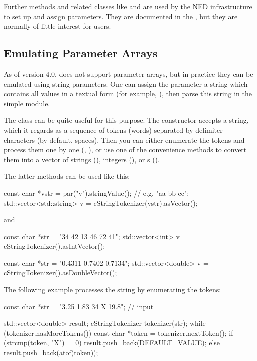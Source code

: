 Further  methods and related classes like  and
 are used by the NED infrastructure to set up and
assign parameters. They are documented in the , but
they are normally of little interest for users.


\subsection{Emulating Parameter Arrays}

As of version 4.0, {\opp} does not support parameter arrays,
but in practice they can be emulated using string parameters.
One can assign the parameter a string which contains all values
in a textual form (for example, ), then
parse this string in the simple module.

The  class can be quite useful for this
purpose. The constructor accepts a string, which it regards as
a sequence of tokens (words) separated by delimiter characters
(by default, spaces). Then you can either enumerate the tokens
and process them one by one (, ),
or use one of the  convenience methods to convert
them into a vector of strings (), integers (),
or s ().

The latter methods can be used like this:

\begin{cpp}
const char *vstr = par("v").stringValue(); // e.g. "aa bb cc";
std::vector<std::string> v = cStringTokenizer(vstr).asVector();
\end{cpp}

and

\begin{cpp}
const char *str = "34 42 13 46 72 41";
std::vector<int> v = cStringTokenizer().asIntVector();

const char *str = "0.4311 0.7402 0.7134";
std::vector<double> v = cStringTokenizer().asDoubleVector();
\end{cpp}

The following example processes the string by enumerating the tokens:

\begin{cpp}
const char *str = "3.25 1.83 34 X 19.8"; // input

std::vector<double> result;
cStringTokenizer tokenizer(str);
while (tokenizer.hasMoreTokens())
{
    const char *token = tokenizer.nextToken();
    if (strcmp(token, "X")==0)
        result.push_back(DEFAULT_VALUE);
    else
        result.push_back(atof(token));
}
\end{cpp}


